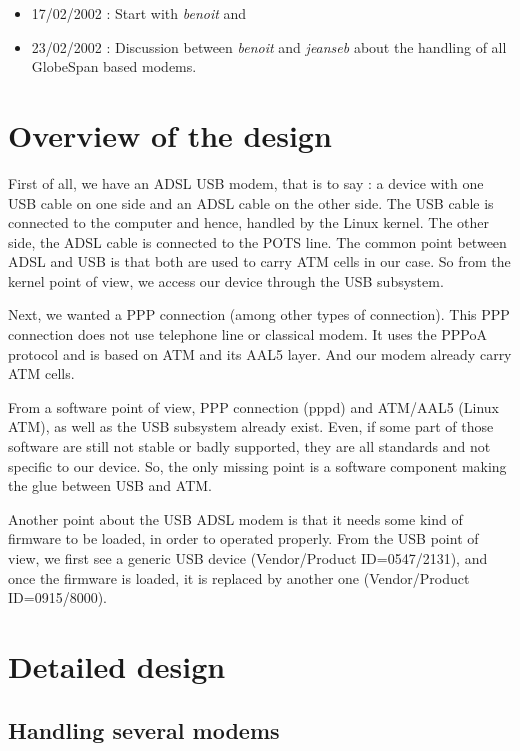 \documentclass[a4paper,12pt]{article}
\begin{document}
\begin{itemize}
\item 17/02/2002 : Start with \textit{benoit} and 
\item 23/02/2002 : Discussion between \textit{benoit} and
  \textit{jeanseb} about the handling of all GlobeSpan based modems.
\end{itemize}

\section{Overview of the design}

First of all, we have an ADSL USB modem, that is to say : a device
with one USB cable on one side and an ADSL cable on the other side.
The USB cable is connected to the computer and hence, handled by the
Linux kernel. The other side, the ADSL cable is connected to the POTS
line. The common point between ADSL and USB is that both are used to
carry ATM cells in our case. So from the kernel point of view, we
access our device through the USB subsystem.

Next, we wanted a PPP connection (among other types of connection).
This PPP connection does not use telephone line or classical modem. It
uses the PPPoA protocol and is based on ATM and its AAL5 layer. And
our modem already carry ATM cells.

From a software point of view, PPP connection (pppd) and ATM/AAL5
(Linux ATM), as well as the USB subsystem already exist. Even, if some
part of those software are still not stable or badly supported, they
are all standards and not specific to our device. So, the only missing
point is a software component making the glue between USB and ATM.

Another point about the USB ADSL modem is that it needs some kind of
firmware to be loaded, in order to operated properly. From the USB
point of view, we first see a generic USB device (Vendor/Product
ID=0547/2131), and once the firmware is loaded, it is replaced by
another one (Vendor/Product ID=0915/8000).

\section{Detailed design}

\subsection{Handling several modems}
\end{document}
